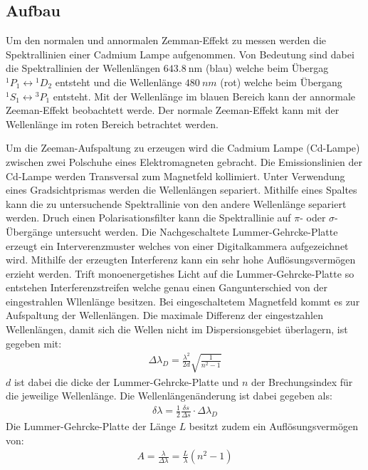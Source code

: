 \subsection{Aufbau}
Um den normalen und annormalen Zemman-Effekt zu messen werden die Spektrallinien einer Cadmium Lampe aufgenommen.
Von Bedeutung sind dabei die Spektrallinien der Wellenlängen $\SI{643.8}{\nano\meter}$ (blau) welche beim Übergag ${}^1P_1\leftrightarrow{}^1D_2$ entsteht und
die Wellenlänge $\SI{480}{nm}$ (rot) welche beim Übergang ${}^1S_1\leftrightarrow{}^3P_1$ entsteht.
Mit der Wellenlänge im blauen Bereich kann der annormale Zeeman-Effekt beobachtett werde.
Der normale Zeeman-Effekt kann mit der Wellenlänge im roten Bereich betrachtet werden.

Um die Zeeman-Aufspaltung zu erzeugen wird die Cadmium Lampe (Cd-Lampe) zwischen zwei Polschuhe eines Elektromagneten gebracht.
Die Emissionslinien der Cd-Lampe werden Transversal zum Magnetfeld kollimiert.
Unter Verwendung eines Gradsichtprismas werden die Wellenlängen separiert.
Mithilfe eines Spaltes kann die zu untersuchende Spektrallinie von den andere Wellenlänge separiert werden.
Druch einen Polarisationsfilter kann die Spektrallinie auf $\pi$- oder $\sigma$- Übergänge untersucht werden.
Die Nachgeschaltete Lummer-Gehrcke-Platte erzeugt ein Interverenzmuster welches von einer Digitalkammera aufgezeichnet wird.
Mithilfe der erzeugten Interferenz kann ein sehr hohe Auflösungsvermögen erzieht werden.
Trift monoenergetishes Licht auf die Lummer-Gehrcke-Platte so entstehen Interferenzstreifen welche genau einen Gangunterschied von der eingestrahlen Wllenlänge besitzen.
Bei eingeschaltetem Magnetfeld kommt es zur Aufspaltung der Wellenlängen.
Die maximale Differenz der eingestzahlen Wellenlängen, damit sich die Wellen nicht im Dispersionsgebiet überlagern, ist gegeben mit:
\begin{align}
	\Delta \lambda_D =\frac{\lambda^2}{2d}\sqrt{\frac{1}{n^2-1}}
	\label{eqn:dispersionsgebiet}
\end{align}
$d$ ist dabei die dicke der Lummer-Gehrcke-Platte und $n$ der Brechungsindex für die jeweilige Wellenlänge.
Die Wellenlängenänderung ist dabei gegeben als:
\begin{align}
  \delta \lambda = \frac{1}{2}\frac{\delta s}{\Delta s}\cdot \Delta\lambda_D
	\label{eqn:wellenlänge}
\end{align}
Die Lummer-Gehrcke-Platte der Länge $L$ besitzt zudem ein Auflösungsvermögen von:
\begin{align}
 A=\frac{\lambda}{\Delta\lambda}=\frac{L}{\lambda}(n^2-1)
 \label{eqn:auflösung}
\end{align}



